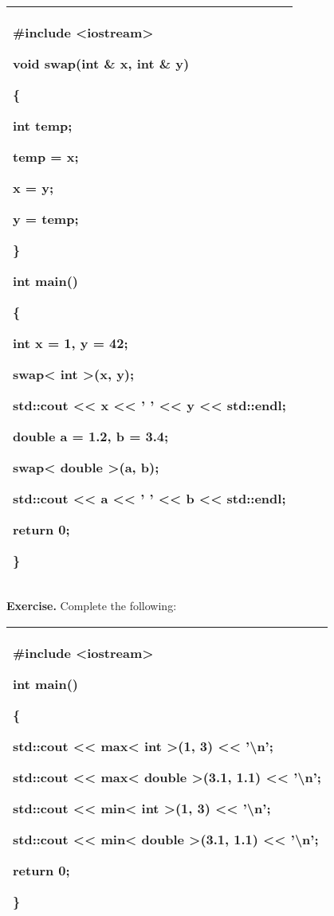\documentclass[
]{article}
\begin{document}
\begin{longtable}[]{@{}l@{}}
\toprule
\endhead
\begin{minipage}[t]{0.97\columnwidth}\raggedright
\#include \textless iostream\textgreater{}

void swap(\textbf{int} \& x, \textbf{int} \& y)

\{

\textbf{int} temp;

temp = x;

x = y;

y = temp;

\}

int main()

\{

int x = 1, y = 42;

swap\textless{} int \textgreater(x, y);

std::cout \textless\textless{} x \textless\textless{} ' '
\textless\textless{} y \textless\textless{} std::endl;

double a = 1.2, b = 3.4;

swap\textless{} double \textgreater(a, b);

std::cout \textless\textless{} a \textless\textless{} ' '
\textless\textless{} b \textless\textless{} std::endl;

return 0;

\} \strut
\end{minipage}\tabularnewline
\bottomrule
\end{longtable}

\textbf{Exercise.} Complete the following:

\begin{longtable}[]{@{}l@{}}
\toprule
\endhead
\begin{minipage}[t]{0.97\columnwidth}\raggedright
\#include \textless iostream\textgreater{}

int main()

\{

std::cout \textless\textless{} max\textless{} int \textgreater(1, 3)
\textless\textless{} '\textbackslash n';

std::cout \textless\textless{} max\textless{} double \textgreater(3.1,
1.1) \textless\textless{} '\textbackslash n';

std::cout \textless\textless{} min\textless{} int \textgreater(1, 3)
\textless\textless{} '\textbackslash n';

std::cout \textless\textless{} min\textless{} double \textgreater(3.1,
1.1) \textless\textless{} '\textbackslash n';

return 0;

\} \strut
\end{minipage}\tabularnewline
\bottomrule
\end{longtable}
\end{document}

